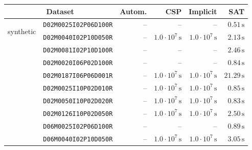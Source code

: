\begin{tabular}{cc|rrrr}
\multicolumn{2}{c|}{                 Dataset} &                        Autom. &                           CSP &                      Implicit &                           SAT\\
\hline
\multirow{24}{*}{\begin{turn}{90}synthetic\end{turn}}
 & \texttt{\footnotesize  D02M0025I02P06D100R} &                              -- &                              -- &                              -- & $             0.51\,\text{s}$\\
 & \texttt{\footnotesize  D02M0040I02P10D050R} &                              -- & $  1.0\cdot 10^{7}\,\text{s}$ & $  1.0\cdot 10^{7}\,\text{s}$ & $             2.13\,\text{s}$\\
 & \texttt{\footnotesize  D02M0081I02P10D100R} &                              -- &                              -- &                              -- & $             2.46\,\text{s}$\\
 & \texttt{\footnotesize  D02M0020I06P02D100R} &                              -- &                              -- &                              -- & $             0.84\,\text{s}$\\
 & \texttt{\footnotesize  D02M0187I06P06D001R} &                              -- & $  1.0\cdot 10^{7}\,\text{s}$ & $  1.0\cdot 10^{7}\,\text{s}$ & $            21.29\,\text{s}$\\
 & \texttt{\footnotesize  D02M0025I10P02D010R} &                              -- & $  1.0\cdot 10^{7}\,\text{s}$ & $  1.0\cdot 10^{7}\,\text{s}$ & $             0.85\,\text{s}$\\
 & \texttt{\footnotesize  D02M0050I10P02D020R} &                              -- & $  1.0\cdot 10^{7}\,\text{s}$ & $  1.0\cdot 10^{7}\,\text{s}$ & $             0.83\,\text{s}$\\
 & \texttt{\footnotesize  D02M0126I10P02D050R} &                              -- & $  1.0\cdot 10^{7}\,\text{s}$ & $  1.0\cdot 10^{7}\,\text{s}$ & $             2.50\,\text{s}$\\
 & \texttt{\footnotesize  D06M0025I02P06D100R} &                              -- &                              -- &                              -- & $             0.89\,\text{s}$\\
 & \texttt{\footnotesize  D06M0040I02P10D050R} &                              -- & $  1.0\cdot 10^{7}\,\text{s}$ & $  1.0\cdot 10^{7}\,\text{s}$ & $             3.05\,\text{s}$\\

\end{tabular}
